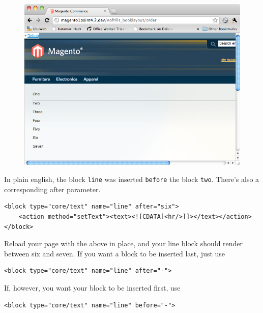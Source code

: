 \documentclass[oneside]{book}
\begin{document}
\begin{figure}[htb]
\begin{center}
\leavevmode
\includegraphics[width=1\textwidth]{images/chapter5/order-before-two.png}
\end{center}
\caption{}
\end{figure}


In plain english, the block \footnotesize\texttt{line} \normalsize  was inserted \footnotesize\texttt{before} \normalsize  the block \footnotesize\texttt{two}\normalsize.  There's also a corresponding after parameter.

\begin{lstlisting}
<block type="core/text" name="line" after="six">
    <action method="setText"><text><![CDATA[<hr/>]]></text></action>
</block>                                

\end{lstlisting}


Reload your page with the above in place, and your line block should render between six and seven.  If you want a block to be inserted last, just use

\begin{lstlisting}
<block type="core/text" name="line" after="-">

\end{lstlisting}


If, however, you want your block to be inserted first, use

\begin{lstlisting}
<block type="core/text" name="line" before="-">

\end{lstlisting}
\end{document}
